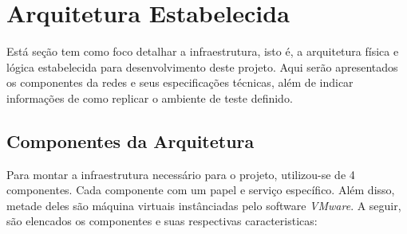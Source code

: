 \chapter{Arquitetura Estabelecida}
\label{chap:Arquitetura}
	
	Está seção tem como foco detalhar a infraestrutura, isto é, a arquitetura física e lógica estabelecida para desenvolvimento deste projeto. Aqui serão apresentados os componentes da redes e seus especificações técnicas, além de indicar informações de como replicar o ambiente de teste definido. 

	\section{Componentes da Arquitetura}
	\label{sec:Arquitetura_Componentes}

		Para montar a infraestrutura necessário para o projeto, utilizou-se de 4 componentes. Cada componente com um papel e serviço específico. Além disso, metade deles são máquina virtuais instânciadas pelo software \emph{VMware}. A seguir, são elencados os componentes e suas respectivas caracteristicas:

